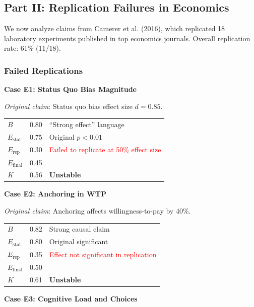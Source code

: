 \documentclass[11pt,a4paper]{article}
\begin{document}
\subsection{Part II: Replication Failures in Economics}

We now analyze claims from Camerer et al. (2016), which replicated 18 laboratory experiments published in top economics journals. Overall replication rate: 61\% (11/18).

\subsubsection{Failed Replications}

\textbf{Case E1: Status Quo Bias Magnitude}

\textit{Original claim}: Status quo bias effect size $d = 0.85$.

\begin{center}
\begin{tabular}{lcl}
\toprule
$B$ & 0.80 & ``Strong effect'' language \\
$E_{\text{stat}}$ & 0.75 & Original $p < 0.01$ \\
$E_{\text{rep}}$ & 0.30 & \textcolor{red}{Failed to replicate at 50\% effect size} \\
\midrule
$E_{\text{final}}$ & 0.45 & \\
$K$ & 0.56 & \textbf{Unstable} \\
\bottomrule
\end{tabular}
\end{center}

\textbf{Case E2: Anchoring in WTP}

\textit{Original claim}: Anchoring affects willingness-to-pay by 40\%.

\begin{center}
\begin{tabular}{lcl}
\toprule
$B$ & 0.82 & Strong causal claim \\
$E_{\text{stat}}$ & 0.80 & Original significant \\
$E_{\text{rep}}$ & 0.35 & \textcolor{red}{Effect not significant in replication} \\
\midrule
$E_{\text{final}}$ & 0.50 & \\
$K$ & 0.61 & \textbf{Unstable} \\
\bottomrule
\end{tabular}
\end{center}

\textbf{Case E3: Cognitive Load and Choices}
\end{document}

